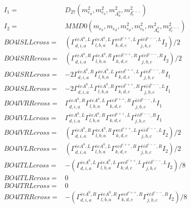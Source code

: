 \documentclass[A4,landscape]{article}
\begin{document}
\begin{align} 
I_1 = & D_{27}(m^2_{e_{{d}}}, m^2_{e_{{b}}}, m^2_{A^0_{{a}}}, m^2_{\delta^{c--}_{{c}}}) \\ 
I_2 = & MMD0(m_{e_{{b}}}, m_{e_{{d}}}, m^2_{e_{{d}}}, m^2_{e_{{b}}}, m^2_{A^0_{{a}}}, m^2_{\delta^{c--}_{{c}}}) \\ 
  BO4lSLLcross= & ( \Gamma^{\bar{e}e A^0 ,L}_{d, i, a} \Gamma^{\bar{e}e A^0 ,L}_{l, b, a} \Gamma^{e e \delta^{c++},L}_{k, d, c} \Gamma^{\bar{e}\bar{e}\delta^{c--} ,L}_{j, b, c} I_2)/2 \\ 
  BO4lSRRcross= & ( \Gamma^{\bar{e}e A^0 ,R}_{d, i, a} \Gamma^{\bar{e}e A^0 ,R}_{l, b, a} \Gamma^{e e \delta^{c++},R}_{k, d, c} \Gamma^{\bar{e}\bar{e}\delta^{c--} ,R}_{j, b, c} I_2)/2 \\ 
  BO4lSRLcross= & -2  \Gamma^{\bar{e}e A^0 ,R}_{d, i, a} \Gamma^{\bar{e}e A^0 ,L}_{l, b, a} \Gamma^{e e \delta^{c++},L}_{k, d, c} \Gamma^{\bar{e}\bar{e}\delta^{c--} ,R}_{j, b, c} I_1 \\ 
  BO4lSLRcross= & -2  \Gamma^{\bar{e}e A^0 ,L}_{d, i, a} \Gamma^{\bar{e}e A^0 ,R}_{l, b, a} \Gamma^{e e \delta^{c++},R}_{k, d, c} \Gamma^{\bar{e}\bar{e}\delta^{c--} ,L}_{j, b, c} I_1 \\ 
  BO4lVRRcross= &  \Gamma^{\bar{e}e A^0 ,R}_{d, i, a} \Gamma^{\bar{e}e A^0 ,L}_{l, b, a} \Gamma^{e e \delta^{c++},R}_{k, d, c} \Gamma^{\bar{e}\bar{e}\delta^{c--} ,L}_{j, b, c} I_1 \\ 
  BO4lVLLcross= &  \Gamma^{\bar{e}e A^0 ,L}_{d, i, a} \Gamma^{\bar{e}e A^0 ,R}_{l, b, a} \Gamma^{e e \delta^{c++},L}_{k, d, c} \Gamma^{\bar{e}\bar{e}\delta^{c--} ,R}_{j, b, c} I_1 \\ 
  BO4lVRLcross= & ( \Gamma^{\bar{e}e A^0 ,R}_{d, i, a} \Gamma^{\bar{e}e A^0 ,R}_{l, b, a} \Gamma^{e e \delta^{c++},L}_{k, d, c} \Gamma^{\bar{e}\bar{e}\delta^{c--} ,L}_{j, b, c} I_2)/2 \\ 
  BO4lVLRcross= & ( \Gamma^{\bar{e}e A^0 ,L}_{d, i, a} \Gamma^{\bar{e}e A^0 ,L}_{l, b, a} \Gamma^{e e \delta^{c++},R}_{k, d, c} \Gamma^{\bar{e}\bar{e}\delta^{c--} ,R}_{j, b, c} I_2)/2 \\ 
  BO4lTLLcross= & -( \Gamma^{\bar{e}e A^0 ,L}_{d, i, a} \Gamma^{\bar{e}e A^0 ,L}_{l, b, a} \Gamma^{e e \delta^{c++},L}_{k, d, c} \Gamma^{\bar{e}\bar{e}\delta^{c--} ,L}_{j, b, c} I_2)/8 \\ 
  BO4lTLRcross= & 0 \\ 
  BO4lTRLcross= & 0 \\ 
  BO4lTRRcross= & -( \Gamma^{\bar{e}e A^0 ,R}_{d, i, a} \Gamma^{\bar{e}e A^0 ,R}_{l, b, a} \Gamma^{e e \delta^{c++},R}_{k, d, c} \Gamma^{\bar{e}\bar{e}\delta^{c--} ,R}_{j, b, c} I_2)/8 \\ 
\end{align} 
\end{document}

